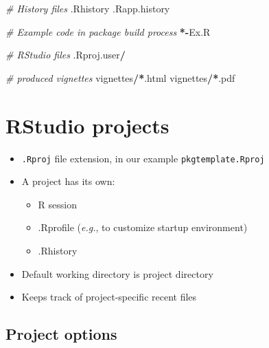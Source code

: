 \documentclass[]{book}
\newenvironment{Shaded}{\begin{snugshade}}{\end{snugshade}}
\newcommand{\CommentTok}[1]{\textcolor[rgb]{0.56,0.35,0.01}{\textit{#1}}}
\newcommand{\OperatorTok}[1]{\textcolor[rgb]{0.81,0.36,0.00}{\textbf{#1}}}
\newcommand{\ErrorTok}[1]{\textcolor[rgb]{0.64,0.00,0.00}{\textbf{#1}}}
\newcommand{\NormalTok}[1]{#1}
\providecommand{\tightlist}{%
  \setlength{\itemsep}{0pt}\setlength{\parskip}{0pt}}
\theoremstyle{definition}
\theoremstyle{definition}
\theoremstyle{definition}
\theoremstyle{remark}
\begin{document}
\begin{Shaded}
\begin{Highlighting}[]
\CommentTok{# History files}
\NormalTok{.Rhistory}
\NormalTok{.Rapp.history}

\CommentTok{# Example code in package build process}
\OperatorTok{*-}\NormalTok{Ex.R}

\CommentTok{# RStudio files}
\NormalTok{.Rproj.user}\OperatorTok{/}

\CommentTok{# produced vignettes}
\NormalTok{vignettes}\OperatorTok{/}\ErrorTok{*}\NormalTok{.html}
\NormalTok{vignettes}\OperatorTok{/}\ErrorTok{*}\NormalTok{.pdf}
\end{Highlighting}
\end{Shaded}

\section{RStudio projects}\label{rstudio-projects}

\begin{itemize}
\item
  \texttt{.Rproj} file extension, in our example
  \texttt{pkgtemplate.Rproj}
\item
  A project has its own:

  \begin{itemize}
  \tightlist
  \item
    R session
  \item
    .Rprofile (\emph{e.g.}, to customize startup environment)
  \item
    .Rhistory
  \end{itemize}
\item
  Default working directory is project directory
\item
  Keeps track of project-specific recent files
\end{itemize}

\subsection{Project options}\label{project-options}
\end{document}
